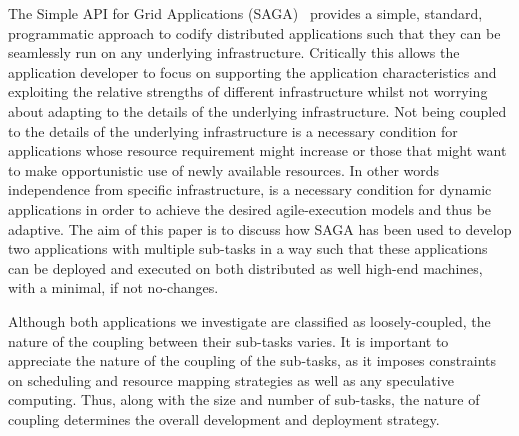 \documentclass{llncs}
\begin{document}

The Simple API for Grid Applications (SAGA)~\cite{saga-core, saga_url}
provides a simple, standard, programmatic approach to codify
distributed applications such that they can be seamlessly run on any
underlying infrastructure. Critically this allows the application
developer to focus on supporting the application characteristics and
exploiting the relative strengths of different infrastructure whilst
not worrying about adapting to the details of the underlying
infrastructure. Not being coupled to the details of the underlying
infrastructure is a necessary condition for applications whose
resource requirement might increase or those that might want to make
opportunistic use of newly available resources. In other words
independence from specific infrastructure, is a necessary condition
for dynamic applications in order to achieve the desired
agile-execution models and thus be adaptive.  The aim of this paper is
to discuss how SAGA has been used to develop two applications with
multiple sub-tasks in a way such that these applications can be
deployed and executed on both distributed as well high-end machines,
with a minimal, if not no-changes.


Although both applications we investigate are classified as
loosely-coupled, the nature of the coupling between their sub-tasks
varies. It is important to appreciate the nature of the coupling of
the sub-tasks, as it imposes constraints on scheduling and resource
mapping strategies as well as any speculative computing.  Thus, along
with the size and number of sub-tasks, the nature of coupling
determines the overall development and deployment strategy.

\end{document}
